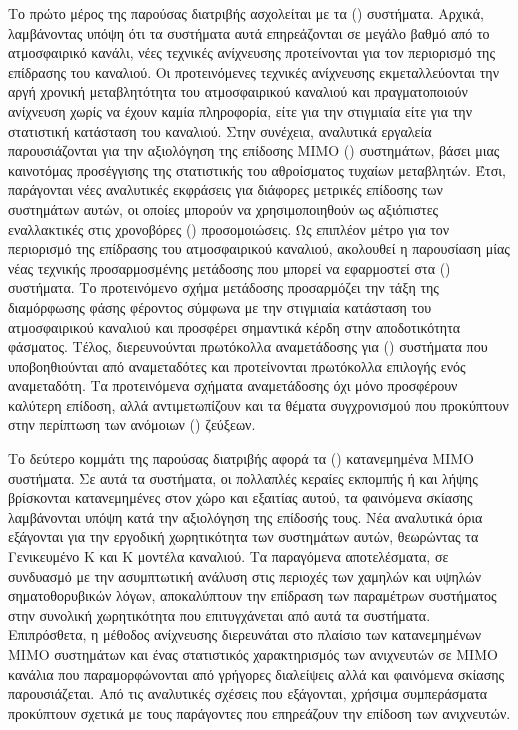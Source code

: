 \documentclass[11pt]{article}
\begin{document}
Το πρώτο μέρος της παρούσας διατριβής ασχολείται με τα () \greektext συστήματα. Αρχικά, λαμβάνοντας υπόψη ότι τα συστήματα αυτά επηρεάζονται σε μεγάλο βαθμό από το ατμοσφαιρικό κανάλι, νέες τεχνικές ανίχνευσης προτείνονται για τον περιορισμό της επίδρασης του καναλιού. Οι προτεινόμενες τεχνικές ανίχνευσης εκμεταλλεύονται την αργή χρονική μεταβλητότητα του ατμοσφαιρικού καναλιού και πραγματοποιούν ανίχνευση χωρίς να έχουν καμία πληροφορία, είτε για την στιγμιαία είτε για την στατιστική κατάσταση του καναλιού. Στην συνέχεια, αναλυτικά εργαλεία παρουσιάζονται για την αξιολόγηση της επίδοσης MIMO () \greektext συστημάτων, βάσει μιας καινοτόμας προσέγγισης της στατιστικής του αθροίσματος  \greektext τυχαίων μεταβλητών. Έτσι, παράγονται νέες αναλυτικές εκφράσεις για διάφορες μετρικές επίδοσης των συστημάτων αυτών, οι οποίες μπορούν να χρησιμοποιηθούν ως αξιόπιστες εναλλακτικές στις χρονοβόρες () \greektext προσομοιώσεις. Ως επιπλέον μέτρο για τον περιορισμό της επίδρασης του ατμοσφαιρικού καναλιού, ακολουθεί η παρουσίαση μίας νέας τεχνικής προσαρμοσμένης μετάδοσης που μπορεί να εφαρμοστεί στα () \greektext συστήματα. Το προτεινόμενο σχήμα μετάδοσης προσαρμόζει την τάξη της διαμόρφωσης φάσης φέροντος σύμφωνα με την στιγμιαία κατάσταση του ατμοσφαιρικού καναλιού και προσφέρει σημαντικά κέρδη στην αποδοτικότητα φάσματος. Τέλος, διερευνούνται πρωτόκολλα αναμετάδοσης για () \greektext συστήματα που υποβοηθιούνται από αναμεταδότες και προτείνονται πρωτόκολλα επιλογής ενός αναμεταδότη. Τα προτεινόμενα σχήματα αναμετάδοσης όχι μόνο προσφέρουν καλύτερη επίδοση, αλλά αντιμετωπίζουν και τα θέματα συγχρονισμού που προκύπτουν στην περίπτωση των ανόμοιων () \greektext ζεύξεων.

Το δεύτερο κομμάτι της παρούσας διατριβής αφορά τα () \greektext κατανεμημένα MIMO συστήματα. Σε αυτά τα συστήματα, οι πολλαπλές κεραίες εκπομπής ή και λήψης βρίσκονται κατανεμημένες στον χώρο και εξαιτίας αυτού, τα φαινόμενα σκίασης λαμβάνονται υπόψη κατά την αξιολόγηση της επίδοσής τους. Νέα αναλυτικά όρια εξάγονται για την εργοδική χωρητικότητα των συστημάτων αυτών, θεωρώντας τα Γενικευμένο K και K μοντέλα καναλιού. Τα παραγόμενα αποτελέσματα, σε συνδυασμό με την ασυμπτωτική ανάλυση στις περιοχές των χαμηλών και υψηλών σηματοθορυβικών λόγων, αποκαλύπτουν την επίδραση των παραμέτρων συστήματος στην συνολική χωρητικότητα που επιτυγχάνεται από αυτά τα συστήματα. Επιπρόσθετα, η  \greektext μέθοδος ανίχνευσης διερευνάται στο πλαίσιο των κατανεμημένων MIMO συστημάτων και ένας στατιστικός χαρακτηρισμός των  \greektext ανιχνευτών σε MIMO κανάλια που παραμορφώνονται από γρήγορες διαλείψεις αλλά και φαινόμενα σκίασης παρουσιάζεται. Από τις αναλυτικές σχέσεις που εξάγονται, χρήσιμα συμπεράσματα προκύπτουν σχετικά με τους παράγοντες που επηρεάζουν την επίδοση των  \greektext ανιχνευτών.
\end{document}

